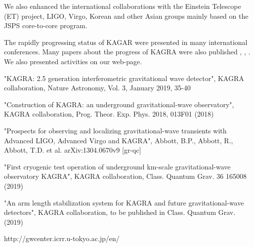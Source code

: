 We also enhanced the international collaborations with the Einstein Telescope (ET) project, LIGO, Virgo, Korean and other Asian groups mainly based on the JSPS core-to-core program.

The rapidly progressing status of KAGAR were presented in many international conferences. Many papers about the progress of KAGRA were also published \cite{kagra_review}, \cite{phase1_paper}, \cite{xarm_com}. We also presented activities on our web-page.\cite{KAGRA}

\begin{thebibliography}{99}


 "KAGRA: 2.5 generation interferometric gravitational wave detector",
KAGRA collaboration, Nature Astronomy, Vol. 3, January 2019, 35-40

 "Construction of KAGRA: an underground gravitational-wave observatory",
KAGRA collaboration,
Prog. Theor. Exp. Phys. 2018, 013F01 (2018)

 "Prospects for observing and localizing gravitational-wave transients with Advanced LIGO, Advanced Virgo and KAGRA",
Abbott, B.P., Abbott, R., Abbott, T.D. et al. arXiv:1304.0670v9 [gr-qc]






 "First cryogenic test operation of underground km-scale gravitational-wave observatory KAGRA",
KAGRA collaboration, Class. Quantum Grav. 36 165008 (2019)




 "An arm length stabilization system for KAGRA and future gravitational-wave detectors",
KAGRA collaboration,
to be published in Class. Quantum Grav. (2019)



%
%
%




 http://gwcenter.icrr.u-tokyo.ac.jp/en/

\end{thebibliography}





